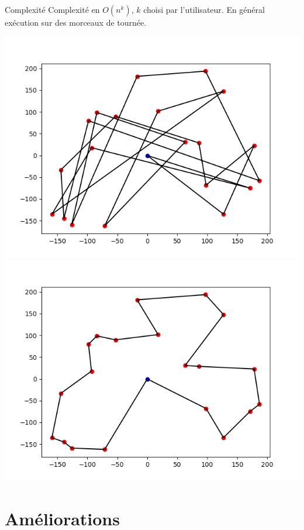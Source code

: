 \documentclass{beamer}
\begin{document}
\begin{frame}
\begin{alertblock}{Complexité}
Complexité en $O(n^k)$, $k$ choisi par l'utilisateur. En général exécution sur des morceaux de tournée.
\end{alertblock}

\begin{center}
\includegraphics[scale=0.32]{test4_20_init.png}
\includegraphics[scale=0.32]{test4_20_LKopt.png}
\end{center}

\end{frame}


\section{Améliorations}
\end{document}
